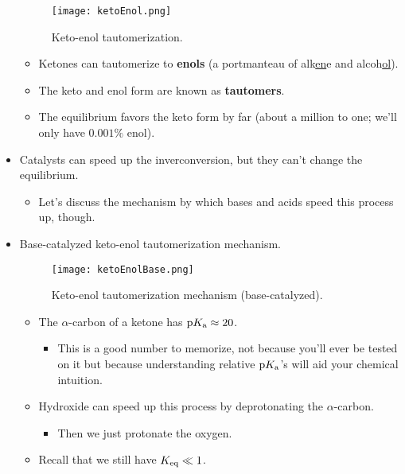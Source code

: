\documentclass[../notes.tex]{subfiles}
\begin{document}
\begin{itemize}
    \begin{figure}[h!]
        \centering
        \texttt{[image: ketoEnol.png]}
        \caption{Keto-enol tautomerization.}
        \label{fig:ketoEnol}
    \end{figure}
    \begin{itemize}
        \item Ketones can tautomerize to \textbf{enols} (a portmanteau of alk\underline{en}e and alcoh\underline{ol}).
        \item The keto and enol form are known as \textbf{tautomers}.
        \item The equilibrium favors the keto form by far (about a million to one; we'll only have $0.001\%$ enol).
    \end{itemize}
    \item Catalysts can speed up the inverconversion, but they can't change the equilibrium.
    \begin{itemize}
        \item Let's discuss the mechanism by which bases and acids speed this process up, though.
    \end{itemize}
    \pagebreak
    \item Base-catalyzed keto-enol tautomerization mechanism.
    \begin{figure}[h!]
        \centering
        \texttt{[image: ketoEnolBase.png]}
        \caption{Keto-enol tautomerization mechanism (base-catalyzed).}
        \label{fig:ketoEnolBase}
    \end{figure}
    \begin{itemize}
        \item The $\alpha$-carbon of a ketone has $\textup{p}K_\textup{a}\approx 20$.
        \begin{itemize}
            \item This is a good number to memorize, not because you'll ever be tested on it but because understanding relative $\textup{p}K_\textup{a}$'s will aid your chemical intuition.
        \end{itemize}
        \item Hydroxide can speed up this process by deprotonating the $\alpha$-carbon.
        \begin{itemize}
            \item Then we just protonate the oxygen.
        \end{itemize}
        \item Recall that we still have $K_\textup{eq}\ll 1$.
    \end{itemize}

\end{itemize}
\end{document}
